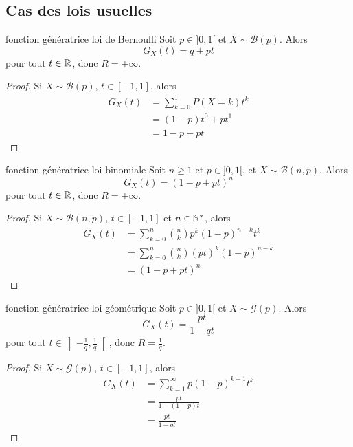 \subsection{Cas des lois usuelles }

\begin{proposition}{fonction génératrice loi de Bernoulli}{}
    Soit $p \in ]0, 1[$ et $X \sim \mathcal B(p)$. Alors 
    $$ G_X(t) = q + p t $$
    pour tout $t \in \mathbb{R}$, donc $R = + \infty$.
\end{proposition}

\begin{proof}
    Si $X \sim \mathcal B(p)$, $t \in [-1, 1]$, alors
    \begin{align}
        G_X(t) & = \sum_{k = 0}^1 P(X = k) t^k \\
        & = (1 - p) t^0 + p t^1 \\
        & = 1 - p + p t
    \end{align}
\end{proof}

\begin{proposition}{fonction génératrice loi binomiale}{}
    Soit $n \geqslant 1$ et $p \in ]0, 1[$, et $X \sim \mathcal B(n, p)$. Alors 
    $$ G_X(t) = (1 - p + p t)^n $$
    pour tout $t \in \mathbb{R}$, donc $R = + \infty$.
\end{proposition}

\begin{proof}
    Si $X \sim \mathcal B(n, p)$, $t \in [-1, 1]$ et $n \in \mathbb{N}^*$, alors
    \begin{align}
        G_X(t) & = \sum_{k = 0}^n \binom n k p^k (1 - p)^{n - k} t^k \\
        & = \sum_{k = 0}^n \binom n k (p t)^k (1 - p)^{n - k} \\
        & = (1 - p + p t)^n
    \end{align}
\end{proof}

\begin{proposition}{fonction génératrice loi géométrique}{}
    Soit $p \in ]0, 1[$ et $X \sim \mathcal G(p)$. Alors 
    $$ G_X(t) = \frac{pt}{1 - q t} $$
    pour tout $t \in \left]-\frac 1 q, \frac 1 q \right[$, donc 
    $R = \frac 1 q $.
\end{proposition}

\begin{proof}
    Si $X \sim \mathcal G(p)$, $t \in [-1, 1]$, alors
    \begin{align}
        G_X(t) & = \sum_{k = 1}^{\infty} p (1 - p)^{k - 1} t^k \\
        & = \frac{pt}{1 - (1 - p) t} \\
        & = \frac{pt}{1 - qt}
    \end{align}
\end{proof}

